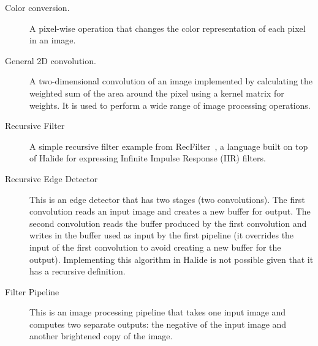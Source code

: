 \begin{description}
\item[Color conversion.] A pixel-wise operation that changes the color representation of each pixel in an image.
 
\item[General 2D convolution.] A two-dimensional convolution of an image implemented by calculating the weighted sum of the area around the pixel using a kernel matrix for weights.  It is used to perform a wide range of image processing operations.



\item[Recursive Filter] A simple recursive filter example from RecFilter~\cite{recfilter}, a language built on top of Halide for expressing Infinite Impulse Response (IIR) filters.

\item[Recursive Edge Detector] This is an edge detector that has two stages (two convolutions).  The first convolution reads an input image and creates a new buffer for output.  The second convolution reads the buffer produced by the first convolution and writes in the buffer used as input by the first pipeline (it overrides the input of the first convolution to avoid creating a new buffer for the output).  Implementing this algorithm in Halide is not possible given that it has a recursive definition.

\item[Filter Pipeline] This is an image processing pipeline that takes one input image and computes two separate outputs: the negative of the input image and another brightened copy of the image.%

\end{description}

